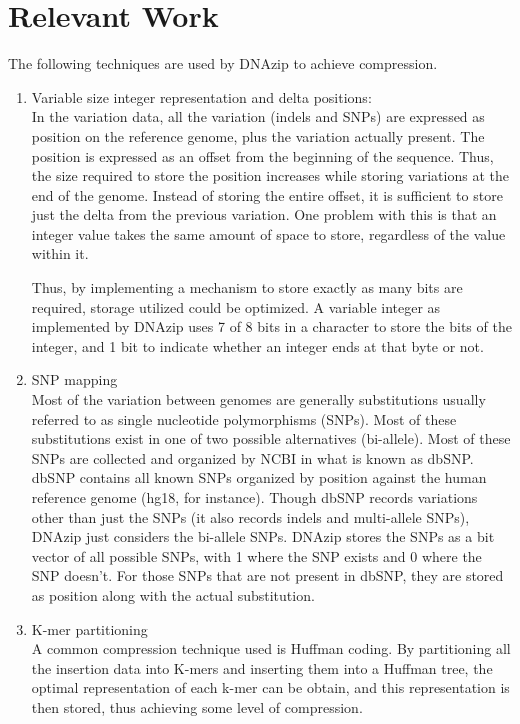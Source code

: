 \documentclass{article}
\begin{document}
\section {Relevant Work}
The following techniques are used by DNAzip to achieve compression.
\begin{enumerate}

\item Variable size integer representation and delta positions:\\
In the variation data, all the variation (indels and SNPs) are expressed as position on the reference genome, plus the variation actually present. The position is expressed as an offset from the beginning of the sequence. Thus, the size required to store the position increases while storing variations at the end of the genome. Instead of storing the entire offset, it is sufficient to store just the delta from the previous variation. One problem with this is that an integer value takes the same amount of space to store, regardless of the value within it. 

Thus, by implementing a mechanism to store exactly as many bits are required, storage utilized could be optimized. A variable integer as implemented by DNAzip uses 7 of 8 bits in a character to store the bits of the integer, and 1 bit to indicate whether an integer ends at that byte or not.\\

\item{SNP mapping}\\
Most of the variation between genomes are generally substitutions usually referred to as single nucleotide polymorphisms (SNPs). Most of these substitutions exist in one of two possible alternatives (bi-allele). Most of these SNPs are collected and organized by NCBI in what is known as dbSNP. dbSNP contains all known SNPs organized by position against the human reference genome (hg18, for instance). Though dbSNP records variations other than just the SNPs (it also records indels and multi-allele SNPs), DNAzip just considers the bi-allele SNPs. DNAzip stores the SNPs as a bit vector of all possible SNPs, with 1 where the SNP exists and 0 where the SNP doesn't. For those SNPs that are not present in dbSNP, they are stored as position along with the actual substitution.\\

\item{K-mer partitioning}\\
A common compression technique used is Huffman coding. By partitioning all the insertion data into K-mers and inserting them into a Huffman tree, the optimal representation of each k-mer can be obtain, and this representation is then stored, thus achieving some level of compression.\\
\end{enumerate}
\clearpage
\end{document}
